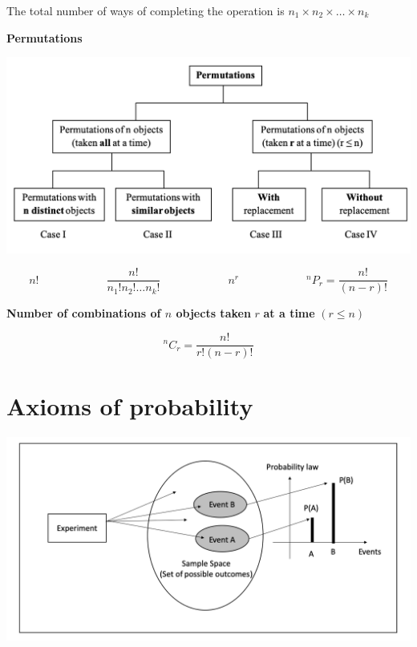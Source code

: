 \documentclass[]{book}
\begin{document}
The total number of ways of completing the operation is \(n_1 \times n_2 \times \dots \times n_k\)

\textbf{Permutations}

\begin{center}\includegraphics[width=1\linewidth]{figure/Permutations} \end{center}

\[n!\quad\quad \quad \quad \quad \quad  \frac{n!}{n_1!n_2!\dots n_k!}\quad\quad \quad \quad \quad \quad n^r\quad \quad \quad \quad  \quad \quad ^nP_r = \frac{n!}{(n-r)!}\]

\textbf{Number of combinations of \(n\) objects taken} \(r\) \textbf{at a time} \(( r \leq n)\)

\[^nC_r = \frac{n!}{r!(n-r)!}\]

\hypertarget{axioms-of-probability}{%
\section{Axioms of probability}\label{axioms-of-probability}}

\begin{center}\includegraphics[width=1\linewidth]{figure/Axioms} \end{center}
\end{document}

